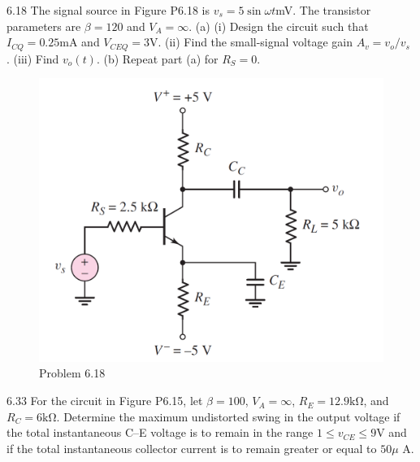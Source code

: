 \documentclass[a4paper,11pt,UTF8]{article}
\begin{document}
6.18 The signal source in Figure P6.18 is $v_s = 5 \sin\omega t $mV. The transistor parameters
are $\beta = 120$ and $V_A =\infty$. (a) (i) Design the circuit such that
$I_{CQ} = 0.25 $mA and $V_{CEQ} = 3 $V. (ii) Find the small-signal voltage gain
$A_v = v_o/v_s$ . (iii) Find $v_o(t)$. (b) Repeat part (a) for $R_S = 0$.
\begin{figure}[H] 
	\centering 
	\includegraphics[scale=0.3]{MD6.18.png}
	\caption{Problem 6.18}
\end{figure}
6.33 For the circuit in Figure P6.15, let $\beta = 100$, $V_A =\infty$, $R_E = 12.9 \mathrm{k\Omega}$, and
$R_C = 6 \mathrm{k\Omega}$. Determine the maximum undistorted swing in the output
voltage if the total instantaneous C–E voltage is to remain in the range
$1 \leq v_{CE} \leq 9 $V and if the total instantaneous collector current is to remain
greater or equal to $50 \mu$ A.
\end{document}
